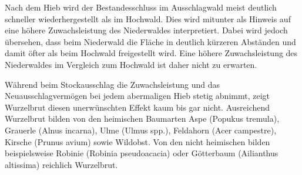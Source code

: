 \documentclass[twocolumn]{scrartcl}
\begin{document}
Nach dem Hieb wird der Bestandesschluss im Ausschlagwald meist deutlich
schneller wiederhergestellt als im Hochwald. Dies wird mitunter als Hinweis auf
eine höhere Zuwachsleistung des Niederwaldes interpretiert. Dabei wird jedoch
übersehen, dass beim Niederwald die Fläche in deutlich kürzeren Abständen und
damit öfter als beim Hochwald freigestellt wird. Eine höhere Zuwachsleistung des
Niederwaldes im Vergleich zum Hochwald ist daher nicht zu erwarten.

Während beim Stockausschlag die Zuwachsleistung und das Neuausschlagvermögen bei
jedem abermaligen Hieb stetig abnimmt, zeigt Wurzelbrut diesen unerwünschten
Effekt kaum bis gar nicht. Ausreichend Wurzelbrut bilden von den heimischen
Baumarten Aspe (Popukus tremula), Grauerle (Alnus incarna), Ulme (Ulmus spp.),
Feldahorn (Acer campestre), Kirsche (Prunus avium) sowie Wildobst. Von den nicht
heimischen bilden beispielsweise Robinie (Robinia pseudoacacia) oder Götterbaum
(Ailianthus altissima) reichlich Wurzelbrut.
\end{document}
